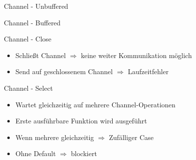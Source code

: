 \documentclass[aspectratio=169]{beamer}  %
\begin{document}

\begin{frame}{Channel - Unbuffered}
  \begin{minipage}{0.49\textwidth}
    
  \end{minipage}
  \hfill
  \hfill
  \begin{minipage}{0.49\textwidth}
  \end{minipage}
\end{frame}

\begin{frame}{Channel - Buffered}
  \begin{minipage}{0.49\textwidth}
    
  \end{minipage}
  \hfill
  \hfill
  \begin{minipage}{0.49\textwidth}
  \end{minipage}
\end{frame}

\begin{frame}{Channel - Close}
  \begin{minipage}{0.49\textwidth}
    \begin{itemize}
      \item Schließt Channel $\Rightarrow$ keine weiter Kommunikation möglich
      \item Send auf geschlossenem Channel $\Rightarrow$ Laufzeitfehler
    \end{itemize}
  \end{minipage}
  \hfill
  \hfill
  \begin{minipage}{0.49\textwidth}
  \end{minipage}
\end{frame}

\begin{frame}{Channel - Select}
  \begin{minipage}{0.49\textwidth}
    \begin{itemize}
      \item Wartet gleichzeitig auf mehrere Channel-Operationen
      \item Erste ausführbare Funktion wird ausgeführt
      \item Wenn mehrere gleichzeitig $\Rightarrow$ Zufälliger Case
      \item Ohne Default $\Rightarrow$ blockiert
    \end{itemize}
  \end{minipage}
  \hfill
  \vrule{}
  \hfill
  \begin{minipage}{0.49\textwidth}
    
  \end{minipage}
\end{frame}
\end{document}
